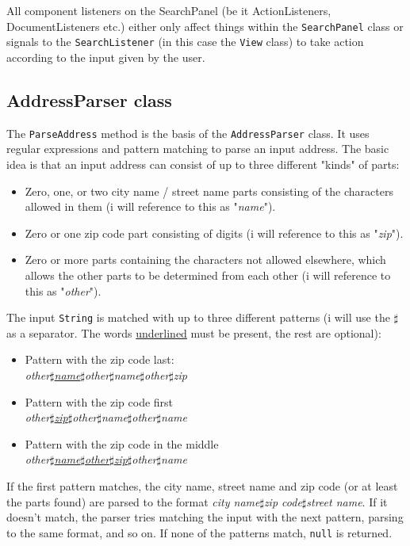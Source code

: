 \documentclass[a4paper,11pt]{article}
\begin{document}
All component listeners on the SearchPanel (be it ActionListeners, DocumentListeners etc.) either only affect things within the \texttt{SearchPanel} class or signals to the \texttt{SearchListener} (in this case the \texttt{View} class) to take action according to the input given by the user.

\subsection{AddressParser class}
The \texttt{ParseAddress} method is the basis of the \texttt{AddressParser} class. It uses regular expressions and pattern matching to parse an input address. The basic idea is that an input address can consist of up to three different "kinds" of parts:
\begin{itemize}
	\item Zero, one, or two city name / street name parts consisting of the characters allowed in them (i will reference to this as "\textit{name}").
	\item Zero or one zip code part consisting of digits (i will reference to this as "\textit{zip}").
	\item Zero or more parts containing the characters not allowed elsewhere, which allows the other parts to be determined from each other (i will reference to this as "\textit{other}").
\end{itemize}
The input \texttt{String} is matched with up to three different patterns (i will use the $\sharp$ as a separator. The words \underline{underlined} must be present, the rest are optional):
\begin{itemize}
	\item Pattern with the zip code last: \\
		\textit{other$\sharp$\underline{name}$\sharp$other$\sharp$name$\sharp$other$\sharp$zip}
	\item Pattern with the zip code first \\
	\textit{other$\sharp$\underline{zip}$\sharp$other$\sharp$name$\sharp$other$\sharp$name}
	\item Pattern with the zip code in the middle \\
	\textit{other$\sharp$\underline{name$\sharp$other$\sharp$zip}$\sharp$other$\sharp$name}
\end{itemize}
If the first pattern matches, the city name, street name and zip code (or at least the parts found) are parsed to the format \textit{city name$\sharp$zip code$\sharp$street name}. If it doesn't match, the parser tries matching the input with the next pattern, parsing to the same format, and so on. If none of the patterns match, \texttt{null} is returned.
\end{document}
